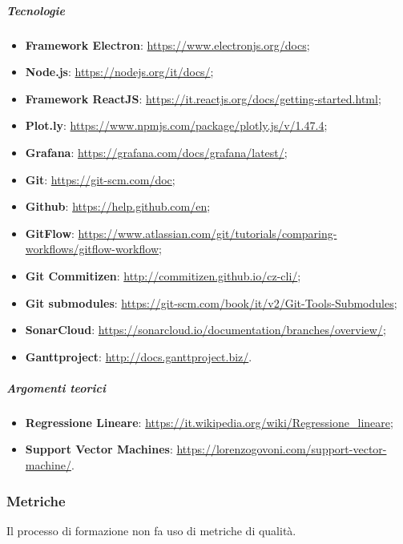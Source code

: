 \subparagraph*{Tecnologie}
\begin{itemize}
  \item \textbf{Framework Electron}: \href{https://www.electronjs.org/docs}{https://www.electronjs.org/docs};
  \item \textbf{Node.js}: \href{https://nodejs.org/it/docs/}{https://nodejs.org/it/docs/};
  \item \textbf{Framework ReactJS}: \href{https://it.reactjs.org/docs/getting-started.html}{https://it.reactjs.org/docs/getting-started.html};
  \item \textbf{Plot.ly}: \href{https://www.npmjs.com/package/plotly.js/v/1.47.4}{https://www.npmjs.com/package/plotly.js/v/1.47.4};
  \item \textbf{Grafana}: \href{https://grafana.com/docs/grafana/latest/}{https://grafana.com/docs/grafana/latest/};
  \item \textbf{Git}: \href{https://git-scm.com/doc}{https://git-scm.com/doc};
  \item \textbf{Github}: \href{https://help.github.com/en}{https://help.github.com/en};
  \item \textbf{GitFlow}: \href{https://www.atlassian.com/git/tutorials/comparing-workflows/gitflow-workflow}{https://www.atlassian.com/git/tutorials/comparing-workflows/gitflow-workflow};
  \item \textbf{Git Commitizen}: \href{http://commitizen.github.io/cz-cli/}{http://commitizen.github.io/cz-cli/};
  \item \textbf{Git submodules}: \href{https://git-scm.com/book/it/v2/Git-Tools-Submodules}{https://git-scm.com/book/it/v2/Git-Tools-Submodules};
  \item \textbf{SonarCloud}: \href{https://sonarcloud.io/documentation/branches/overview/}{https://sonarcloud.io/documentation/branches/overview/};
  \item \textbf{Ganttproject}: \href{http://docs.ganttproject.biz/}{http://docs.ganttproject.biz/}.
\end{itemize}

\subparagraph*{Argomenti teorici}
\begin{itemize}
  \item \textbf{Regressione Lineare}: \href{https://it.wikipedia.org/wiki/Regressione_lineare}{https://it.wikipedia.org/wiki/Regressione\_lineare};
  \item \textbf{Support Vector Machines}: \href{https://lorenzogovoni.com/support-vector-machine/}{https://lorenzogovoni.com/support-vector-machine/}.
\end{itemize}

\subsubsection{Metriche}
Il processo di formazione non fa uso di metriche di qualità.


